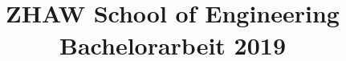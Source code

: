 \title{
  \documenttitle\\[\bigskipamount]
  \large ZHAW School of Engineering\\[\bigskipamount]
  \large Bachelorarbeit 2019
}
\author{\documentauthors}

\maketitle\thispagestyle{empty}
